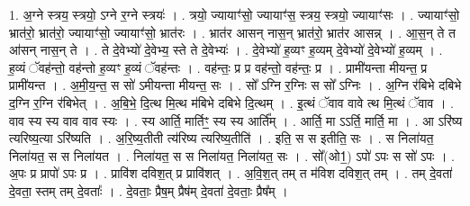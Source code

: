 \documentclass[17pt]{extarticle}
\begin{document}
1. अ॒ग्ने स्त्रय॒ स्त्रयो॒ ऽग्ने र॒ग्ने स्त्रयः॑ । . त्रयो॒ ज्यायाꣳ॑सो॒ ज्यायाꣳ॑स॒ स्त्रय॒ स्त्रयो॒ ज्यायाꣳ॑सः । . ज्यायाꣳ॑सो॒ भ्रात॑रो॒ भ्रात॑रो॒ ज्यायाꣳ॑सो॒ ज्यायाꣳ॑सो॒ भ्रात॑रः । . भ्रात॑र आसन् नास॒न् भ्रात॑रो॒ भ्रात॑र आसन्न् । . आ॒स॒न् ते त आ॑सन् नास॒न् ते । . ते दे॒वेभ्यो॑ दे॒वेभ्य॒ स्ते ते दे॒वेभ्यः॑ । . दे॒वेभ्यो॑ ह॒व्यꣳ ह॒व्यम् दे॒वेभ्यो॑ दे॒वेभ्यो॑ ह॒व्यम् । . ह॒व्यं ॅवह॑न्तो॒ वह॑न्तो ह॒व्यꣳ ह॒व्यं ॅवह॑न्तः । . वह॑न्तः॒ प्र प्र वह॑न्तो॒ वह॑न्तः॒ प्र । . प्रामी॑यन्ता मीयन्त॒ प्र प्रामी॑यन्त । . अ॒मी॒य॒न्त॒ स सो॑ ऽमीयन्ता मीयन्त॒ सः । . सो᳚ ऽग्नि र॒ग्निः स सो᳚ ऽग्निः । . अ॒ग्नि र॑बिभे दबिभे द॒ग्नि र॒ग्नि र॑बिभेत् । . अ॒बि॒भे॒ दि॒त्थ मि॒त्थ म॑बिभे दबिभे दि॒त्थम् । . इ॒त्थं ॅवाव वावे त्थ मि॒त्थं ॅवाव । . वाव स्य स्य वाव वाव स्यः । . स्य आर्ति॒ मार्तिꣳ॒॒ स्य स्य आर्ति᳚म् । . आर्ति॒ मा ऽऽर्ति॒ मार्ति॒ मा । . आ ऽरि॑ष्य त्यरिष्य॒त्या ऽरि॑ष्यति । . अ॒रि॒ष्य॒तीती त्य॑रिष्य त्यरिष्य॒तीति॑ । . इति॒ स स इतीति॒ सः । . स निला॑यत॒ निला॑यत॒ स स निला॑यत । . निला॑यत॒ स स निला॑यत॒ निला॑यत॒ सः । . सो᳚(ओ1॒) ऽपो॑ ऽपः स सो॑ ऽपः । . अ॒पः प्र प्रापो॑ ऽपः प्र । . प्रावि॑श दविश॒त् प्र प्रावि॑शत् । . अ॒वि॒श॒त् तम् त म॑विश दविश॒त् तम् । . तम् दे॒वता॑ दे॒वता॒ स्तम् तम् दे॒वताः᳚ । . दे॒वताः॒ प्रैष॒म् प्रैष॑म् दे॒वता॑ दे॒वताः॒ प्रैष᳚म् । \newline
\end{document}
